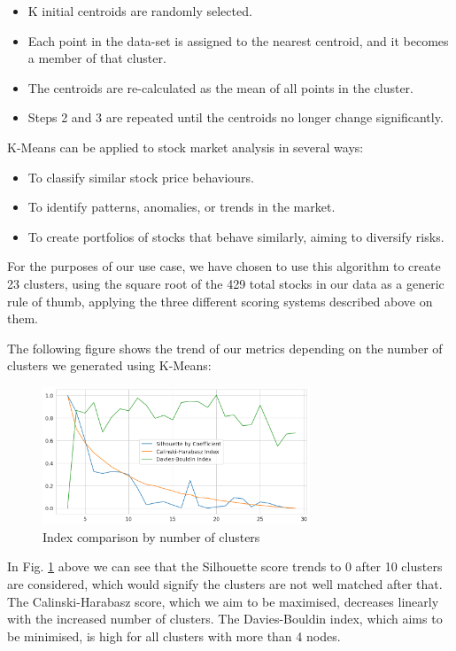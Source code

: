 \documentclass[11pt]{article}
\begin{document}
\begin{itemize}
    \item K initial centroids are randomly selected.
    \item Each point in the data-set is assigned to the nearest centroid, and it becomes a member of that cluster.
    \item The centroids are re-calculated as the mean of all points in the cluster.
    \item Steps 2 and 3 are repeated until the centroids no longer change significantly. 
\end{itemize}

K-Means can be applied to stock market analysis in several ways:

\begin{itemize}
    \item To classify similar stock price behaviours.
    \item To identify patterns, anomalies, or trends in the market.
    \item To create portfolios of stocks that behave similarly, aiming to diversify risks.
\end{itemize}

For the purposes of our use case, we have chosen to use this algorithm to create 23 clusters, using the square root of the 429 total stocks in our data as a generic rule of thumb, applying the three different scoring systems described above on them. 

The following figure shows the trend of our metrics depending on the number of clusters we generated using K-Means: 

\begin{figure}[H]
\centering
\includegraphics[width=8cm]{img/kmeans-index-comparison.png} 
\caption{Index comparison by number of clusters}
\label{fig:kmeansindex}
\end{figure}

In Fig. \ref{fig:kmeansindex} above we can see that the Silhouette score trends to 0 after 10 clusters are considered, which would signify the clusters are not well matched after that. The Calinski-Harabasz score, which we aim to be maximised, decreases linearly with the increased number of clusters. The Davies-Bouldin index, which aims to be minimised, is high for all clusters with more than 4 nodes.
\end{document}

